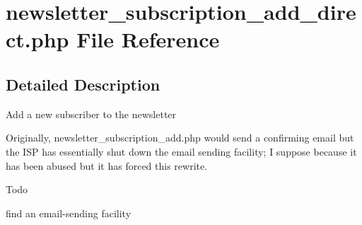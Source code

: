 \section{newsletter\+\_\+subscription\+\_\+add\+\_\+direct.\+php File Reference}
\label{newsletter__subscription__add__direct_8php}


\subsection{Detailed Description}
Add a new subscriber to the newsletter

Originally, newsletter\+\_\+subscription\+\_\+add.\+php would send a confirming email but the I\+SP has essentially shut down the email sending facility; I suppose because it has been abused but it has forced this rewrite.

\begin{DoxyRefDesc}{Todo}
\item[{\bf Todo}]find an email-\/sending facility \end{DoxyRefDesc}
